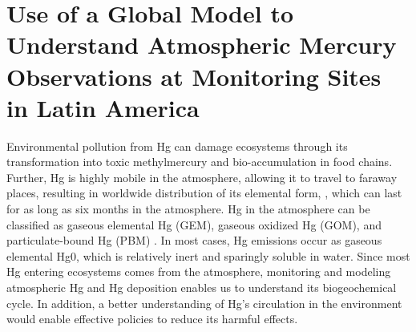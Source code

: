 \chapter{Use of a Global Model to Understand Atmospheric Mercury Observations at Monitoring Sites in Latin America }
\begin{flushleft}
Environmental pollution from Hg can damage ecosystems through its transformation into toxic methylmercury and bio-accumulation in food chains. Further, Hg is highly mobile in the atmosphere, allowing it to travel to faraway places, resulting in worldwide distribution of its elemental form, \hg, which can last for as long as six months in the atmosphere\cite{horowitz_new_2017,shah_improved_2021}. Hg in the atmosphere can be classified as gaseous elemental Hg (GEM), gaseous oxidized Hg (GOM), and particulate-bound Hg (PBM)  \cite{lindberg_synthesis_2007,schroeder_atmospheric_1998,landis_development_2002}. In most cases, Hg emissions occur as gaseous elemental Hg0, which is relatively inert and sparingly soluble in water\cite{horowitz_new_2017}. Since most Hg entering ecosystems comes from the atmosphere, monitoring and modeling atmospheric Hg and Hg deposition enables us to understand its biogeochemical cycle. In addition, a better understanding of Hg's circulation in the environment would enable effective policies to reduce its harmful effects.
\end{flushleft}
